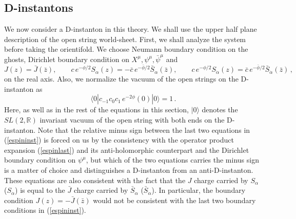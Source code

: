 \documentclass[12pt,a4paper]{article}
\newcommand{\be}{\begin{equation}}
\newcommand{\ee}{\end{equation}}
\newcommand{\refb}[1]{(\ref{#1})}
\newcommand{\IR}{\mathds{R}}
\def\bz{\bar z}
\newcommand{\dalpha}{\beta}
\def\dalpha{{\dot\alpha}}
\begin{document}
\subsection{D-instantons}

We now consider a D-instanton in this theory. We shall use the upper half plane
description of the open string world-sheet. First, we shall analyze the
system before taking the orientifold.
We choose Neumann boundary condition on the ghosts, Dirichlet boundary condition
on $X^\mu,\psi^\mu,\bar\psi^\mu$ and
\be\label{espininst}
J(z)=\bar J(\bar z),
\qquad
c \, e^{-\phi/2} S_\alpha(z) = -\bar c \, e^{-\bar\phi/2} \bar S_\alpha(\bz),
\qquad
c \, e^{-\phi/2} S_\dalpha(z) = \bar c \, e^{-\bar\phi/2} \bar S_\dalpha(\bz) \, ,
\ee
on the real axis. Also, we normalize the vacuum of the open strings on the
D-instanton as
\be\label{eopennorm}
\langle 0| c_{-1} c_0 c_1 \, e^{-2\phi}(0)|0\rangle=1\, .
\ee
Here, as well as in the rest of the equations in this section, $|0\rangle$ denotes the
$SL(2,\IR)$ invariant vacuum of the open string with both ends on the D-instanton.
Note that the
relative minus sign between the last two equations in \refb{espininst} is forced on us by
the consistency with the operator product expansion \refb{espinlast} and its
anti-holomorphic counterpart and the Dirichlet boundary
condition on $\psi^\mu$, but which of the two equations carries the minus sign is a matter of
choice and distinguishes a D-instanton from an anti-D-instanton. These equations are also
consistent with the fact that the $J$ charge carried by $S_\alpha$ ($S_\dalpha$) is equal
to the $\bar J$ charge carried by $\bar S_\alpha$ ($\bar S_\dalpha$). In particular, the boundary
condition $J(z)=-\bar J(\bz)$ would not be consistent with the last two boundary conditions
in \refb{espininst}.
\end{document}
